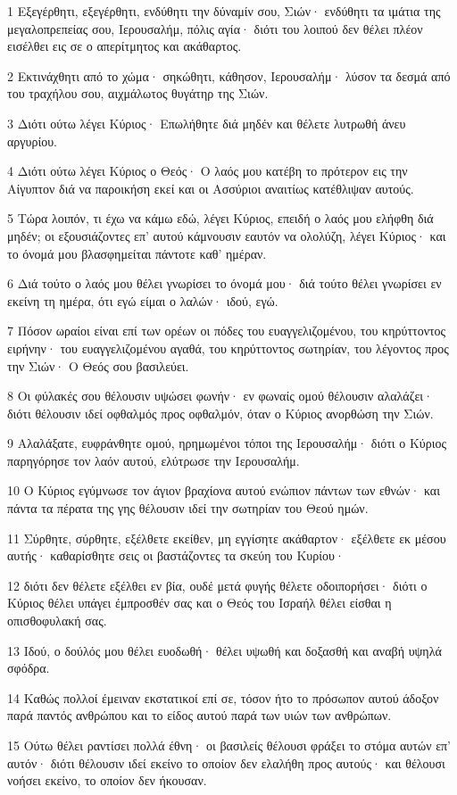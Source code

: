 \par 1 Εξεγέρθητι, εξεγέρθητι, ενδύθητι την δύναμίν σου, Σιών· ενδύθητι τα ιμάτια της μεγαλοπρεπείας σου, Ιερουσαλήμ, πόλις αγία· διότι του λοιπού δεν θέλει πλέον εισέλθει εις σε ο απερίτμητος και ακάθαρτος.
\par 2 Εκτινάχθητι από το χώμα· σηκώθητι, κάθησον, Ιερουσαλήμ· λύσον τα δεσμά από του τραχήλου σου, αιχμάλωτος θυγάτηρ της Σιών.
\par 3 Διότι ούτω λέγει Κύριος· Επωλήθητε διά μηδέν και θέλετε λυτρωθή άνευ αργυρίου.
\par 4 Διότι ούτω λέγει Κύριος ο Θεός· Ο λαός μου κατέβη το πρότερον εις την Αίγυπτον διά να παροικήση εκεί και οι Ασσύριοι αναιτίως κατέθλιψαν αυτούς.
\par 5 Τώρα λοιπόν, τι έχω να κάμω εδώ, λέγει Κύριος, επειδή ο λαός μου ελήφθη διά μηδέν; οι εξουσιάζοντες επ' αυτού κάμνουσιν εαυτόν να ολολύζη, λέγει Κύριος· και το όνομά μου βλασφημείται πάντοτε καθ' ημέραν.
\par 6 Διά τούτο ο λαός μου θέλει γνωρίσει το όνομά μου· διά τούτο θέλει γνωρίσει εν εκείνη τη ημέρα, ότι εγώ είμαι ο λαλών· ιδού, εγώ.
\par 7 Πόσον ωραίοι είναι επί των ορέων οι πόδες του ευαγγελιζομένου, του κηρύττοντος ειρήνην· του ευαγγελιζομένου αγαθά, του κηρύττοντος σωτηρίαν, του λέγοντος προς την Σιών· Ο Θεός σου βασιλεύει.
\par 8 Οι φύλακές σου θέλουσιν υψώσει φωνήν· εν φωναίς ομού θέλουσιν αλαλάζει· διότι θέλουσιν ιδεί οφθαλμός προς οφθαλμόν, όταν ο Κύριος ανορθώση την Σιών.
\par 9 Αλαλάξατε, ευφράνθητε ομού, ηρημωμένοι τόποι της Ιερουσαλήμ· διότι ο Κύριος παρηγόρησε τον λαόν αυτού, ελύτρωσε την Ιερουσαλήμ.
\par 10 Ο Κύριος εγύμνωσε τον άγιον βραχίονα αυτού ενώπιον πάντων των εθνών· και πάντα τα πέρατα της γης θέλουσιν ιδεί την σωτηρίαν του Θεού ημών.
\par 11 Σύρθητε, σύρθητε, εξέλθετε εκείθεν, μη εγγίσητε ακάθαρτον· εξέλθετε εκ μέσου αυτής· καθαρίσθητε σεις οι βαστάζοντες τα σκεύη του Κυρίου·
\par 12 διότι δεν θέλετε εξέλθει εν βία, ουδέ μετά φυγής θέλετε οδοιπορήσει· διότι ο Κύριος θέλει υπάγει έμπροσθέν σας και ο Θεός του Ισραήλ θέλει είσθαι η οπισθοφυλακή σας.
\par 13 Ιδού, ο δούλός μου θέλει ευοδωθή· θέλει υψωθή και δοξασθή και αναβή υψηλά σφόδρα.
\par 14 Καθώς πολλοί έμειναν εκστατικοί επί σε, τόσον ήτο το πρόσωπον αυτού άδοξον παρά παντός ανθρώπου και το είδος αυτού παρά των υιών των ανθρώπων.
\par 15 Ούτω θέλει ραντίσει πολλά έθνη· οι βασιλείς θέλουσι φράξει το στόμα αυτών επ' αυτόν· διότι θέλουσιν ιδεί εκείνο το οποίον δεν ελαλήθη προς αυτούς· και θέλουσι νοήσει εκείνο, το οποίον δεν ήκουσαν.

